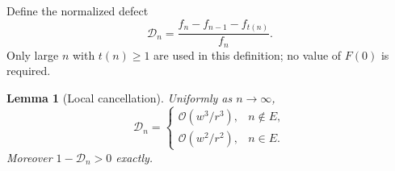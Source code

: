 \documentclass[11pt]{article}
\newtheorem{lemma}[theorem]{Lemma}
\theoremstyle{remark}\newtheorem{remark}[theorem]{Remark}
\newcommand{\OO}{\mathcal O}
\begin{document}
Define the normalized defect
\begin{equation}\label{sfb:sq:eq:defect}
 \mathcal D_n=\frac{f_n-f_{n-1}-f_{t(n)}}{f_n}.
\end{equation}
Only large $n$ with $t(n)\ge1$ are used in this definition; no value of $F(0)$ is required.

\begin{lemma}[Local cancellation]\label{sfb:sq:lem:local}
Uniformly as $n\to\infty$,
\begin{equation}\label{sfb:sq:eq:local}
 \mathcal D_n=\begin{cases}
 \OO(w^3/r^3),&n\notin E,\\
 \OO(w^2/r^2),&n\in E.
 \end{cases}
\end{equation}
Moreover $1-\mathcal D_n>0$ exactly.
\end{lemma}
\end{document}
